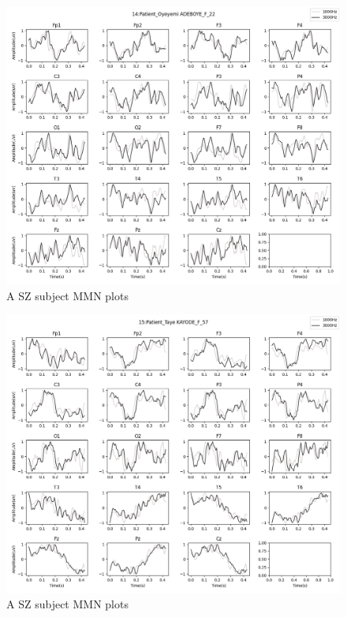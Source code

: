 \documentclass[10pt]{article}
\begin{document}
\begin{figure}[H]
  \includegraphics[width=16cm]{../../../data_analysis_results/MMN/time_series/Patient/14.png}
  \caption{A SZ subject MMN plots}
\end{figure}
\begin{figure}[H]
  \includegraphics[width=16cm]{../../../data_analysis_results/MMN/time_series/Patient/15.png}
  \caption{A SZ subject MMN plots}
\end{figure}
\end{document}
